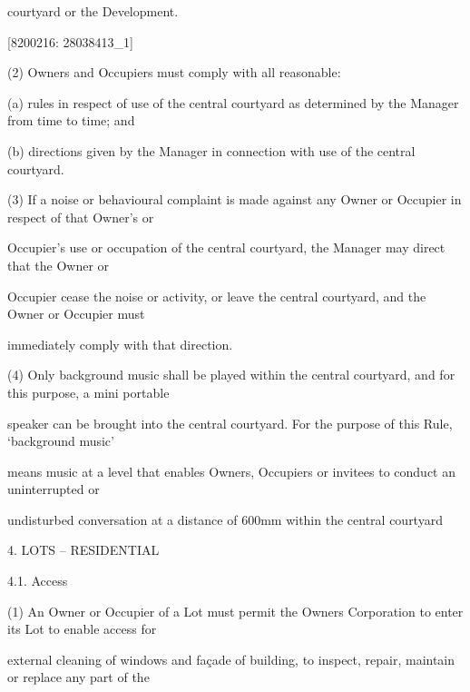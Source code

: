 \documentclass{article}
\begin{document}
{\fontsize{10.02}{1}courtyard or the Development.  }

\newpage
















{\fontsize{7.02}{1}[8200216: 28038413\_1] }

{\fontsize{9.962}{1}(2) Owners and Occupiers must comply with all reasonable: }

{\fontsize{9.962}{1}(a) rules in respect of use of the central courtyard as determined by the Manager from time to time; and }

{\fontsize{9.962}{1}(b) directions given by the Manager in connection with use of the central courtyard. }

{\fontsize{9.962}{1}(3) If a noise or behavioural complaint is made against any Owner or Occupier in respect of that Owner’s or }

{\fontsize{10.02}{1}Occupier’s use or occupation of the central courtyard, the Manager may direct that the Owner or }

{\fontsize{10.02}{1}Occupier cease the noise or activity, or leave the central courtyard, and the Owner or Occupier must }

{\fontsize{10.02}{1}immediately comply with that direction. }

{\fontsize{9.962}{1}(4) Only background music shall be played within the central courtyard, and for this purpose, a mini portable }

{\fontsize{10.02}{1}speaker can be brought into the central courtyard. For the purpose of this Rule, ‘background music’ }

{\fontsize{10.02}{1}means music at a level that enables Owners, Occupiers or invitees to conduct an uninterrupted or }

{\fontsize{10.02}{1}undisturbed conversation at a distance of 600mm within the central courtyard  }


{\fontsize{9.99}{1}4. LOTS – RESIDENTIAL }

{\fontsize{9.99}{1}4.1. Access }

{\fontsize{9.962}{1}(1) An Owner or Occupier of a Lot must permit the Owners Corporation to enter its Lot to enable access for }

{\fontsize{10.02}{1}external cleaning of windows and façade of building, to inspect, repair, maintain or replace any part of the }
\end{document}
